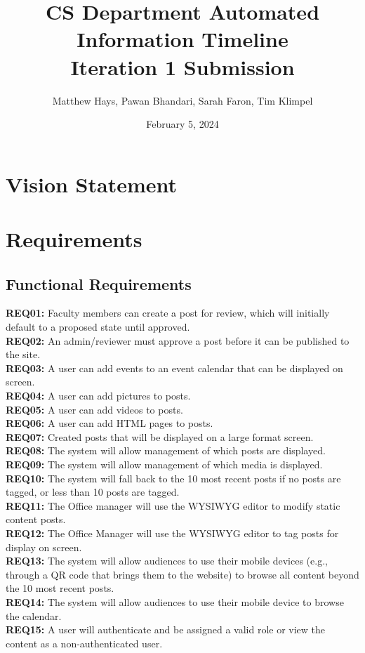 \documentclass{article}
\title{CS Department Automated Information Timeline \\ Iteration 1 Submission}
\date{February 5, 2024}
\author{Matthew Hays, Pawan Bhandari, Sarah Faron, Tim Klimpel}
\begin{document}
\maketitle
\newpage
\tableofcontents
\listoffigures
\newpage
\section{Vision Statement}

\section{Requirements}
\subsection{Functional Requirements}
\textbf{REQ01:} Faculty members can create a post for review, which will initially default to a proposed state until approved. \\
\textbf{REQ02:} An admin/reviewer must approve a post before it can be published to the site. \\
\textbf{REQ03:} A user can add events to an event calendar that can be displayed on screen. \\
\textbf{REQ04:} A user can add pictures to posts. \\
\textbf{REQ05:} A user can add videos to posts. \\
\textbf{REQ06:} A user can add HTML pages to posts. \\
\textbf{REQ07:} Created posts that will be displayed on a large format screen. \\
\textbf{REQ08:} The system will allow management of which posts are displayed. \\
\textbf{REQ09:} The system will allow management of which media is displayed. \\
\textbf{REQ10:} The system will fall back to the 10 most recent posts if no posts are tagged, or less than 10 posts are tagged. \\
\textbf{REQ11:} The Office manager will use the WYSIWYG editor to modify static content posts. \\
\textbf{REQ12:} The Office Manager will use the WYSIWYG editor to tag posts for display on screen. \\
\textbf{REQ13:} The system will allow audiences to use their mobile devices (e.g., through a QR code that brings them to the website) to browse all content beyond the 10 most recent posts. \\
\textbf{REQ14:} The system will allow audiences to use their mobile device to browse the calendar. \\
\textbf{REQ15:} A user will authenticate and be assigned a valid role or view the content as a non-authenticated user. \\
\end{document}
